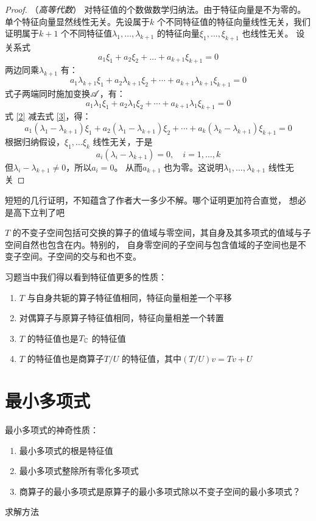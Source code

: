 \begin{proof}
    （\textit{高等代数}）
    对特征值的个数做数学归纳法。由于特征向量是不为零的。单个特征向量显然线性无关。先设属于\(k\)
    个不同特征值的特征向量线性无关，我们证明属于\(k+1\) 个不同特征值\(\lambda_1,\dots
    ,\lambda_{k+1}\) 的特征向量\(\xi_1,\dots, \xi_{k+1}\) 也线性无关。
    设关系式
    \begin{equation}
        a_1\xi_1 + a_2\xi_2 + \dots + a_{k+1}\xi_{k+1} = 0 \label{1}
    \end{equation}
    两边同乘\(\lambda_{k+1}\) 有：
    \begin{equation}
        a_1\lambda_{k+1}\xi_1 + a_2\lambda_{k+1}\xi_2 +
        \cdots + a_{k+1}\lambda_{k+1}\xi_{k+1} = 0 \label{2}
    \end{equation}
    式子两端同时施加变换\(\mathscr{A}\)，有：
    \begin{equation}
        a_1\lambda_1\xi_1 + a_2\lambda_1\xi_2 + \cdots +
        a_{k+1}\lambda_1\xi_{k+1} = 0 \label{3}
    \end{equation}
    式 \eqref{2} 减去式 \eqref{3}，得：
    \[
        a_1(\lambda_1 - \lambda_{k+1})\xi_1 + a_2(\lambda_1
        - \lambda_{k+1})\xi_2 + \cdots +
        a_{k}(\lambda_{k} - \lambda_{k+1})\xi_{k+1} = 0
    \]
    根据归纳假设，\(\xi_1,\dots \xi_{k}\) 线性无关，于是
    \[
        a_{i}(\lambda_{i} - \lambda_{k+1}) = 0, \quad i=1,\dots ,k
    \]
    但\(\lambda_{i}-\lambda_{k+1}\neq 0\)，所以\(a_{i}=0\)。
    从而\(a_{k+1}\) 也为零。这说明\(\lambda_1,\dots ,\lambda_{k+1}\) 线性无关
\end{proof}

短短的几行证明，不知蕴含了作者大一多少不解。哪个证明更加符合直觉，
想必是高下立判了吧

\(T\) 的不变子空间包括可交换的算子的值域与零空间，其自身及其多项式的值域与子空间自然也包含在内。特别的，
自身零空间的子空间与包含值域的子空间也是不变子空间。子空间的交与和也不变。

习题当中我们得以看到特征值更多的性质：
\begin{enumerate}
    \item \(T\) 与自身共轭的算子特征值相同，特征向量相差一个平移
    \item 对偶算子与原算子特征值相同，特征向量相差一个转置
    \item \(T\) 的特征值也是\(T_{\mathbb{C}}\) 的特征值
    \item \(T\) 的特征值也是商算子\(T/U\) 的特征值，其中\((T/U)v=Tv+U\)
\end{enumerate}

\section{最小多项式}


最小多项式的神奇性质：
\begin{enumerate}
    \item 最小多项式的根是特征值
    \item 最小多项式整除所有零化多项式
    \item 商算子的最小多项式是原算子的最小多项式除以不变子空间的最小多项式？
\end{enumerate}
求解方法

